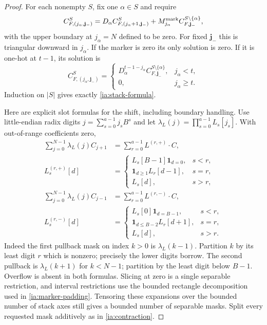 \begin{proof}
For each nonempty $S$, fix one $\alpha\in S$ and require
\begin{equation}
 C^S_{F,(j_\alpha,\mathbf j_-)}
  =D_\alpha C^S_{F,(j_\alpha+1,\mathbf j_-)}
      +M^{\rm mark}_{j_\alpha}
                 C^{S\setminus\{\alpha\}}_{F,\mathbf j_-},
                                                               \label{ia:stack-recurrence}
\end{equation}
with the upper boundary at $j_\alpha=N$ defined to be zero.
For fixed $\mathbf j_-$ this is triangular downward in $j_\alpha$.
If the marker is zero its only solution is zero.  If it is one-hot
at $t-1$, its solution is
\[
 C^S_{F,(j_\alpha,\mathbf j_-)}
   =\begin{cases}
     D_\alpha^{t-1-j_\alpha}
             C^{S\setminus\{\alpha\}}_{F,\mathbf j_-},
                       &j_\alpha<t,\\
     0,                 &j_\alpha\ge t.
    \end{cases}
\]
Induction on $|S|$ gives exactly \eqref{ia:stack-formula}.

Here are explicit slot formulas for the shift, including boundary
handling.  Use little-endian radix digits
$j=\sum_{s=0}^{a-1}j_sB^s$ and let
$\lambda_L(j)=\prod_{s=0}^{a-1}L_s[j_s]$.  With out-of-range
coefficients zero,
\begin{align}
 \sum_{j=0}^{N-1}\lambda_L(j)C_{j+1}
   &=\sum_{r=0}^{a-1}L^{(r,+)}\cdot C,
                                                        \label{ia:radix-plus}\\
 L_s^{(r,+)}[d]
   &=\begin{cases}
      L_s[B-1]\mathbf1_{d=0},&s<r,\\
      \mathbf1_{d\ge1}L_r[d-1],&s=r,\\
      L_s[d],&s>r,
     \end{cases}                                      \nonumber\\
 \sum_{j=0}^{N-1}\lambda_L(j)C_{j-1}
   &=\sum_{r=0}^{a-1}L^{(r,-)}\cdot C,
                                                        \label{ia:radix-minus}\\
 L_s^{(r,-)}[d]
   &=\begin{cases}
      L_s[0]\mathbf1_{d=B-1},&s<r,\\
      \mathbf1_{d\le B-2}L_r[d+1],&s=r,\\
      L_s[d],&s>r.
     \end{cases}                                      \nonumber
\end{align}
Indeed the first pullback mask on index $k>0$ is
$\lambda_L(k-1)$.  Partition $k$ by its least digit $r$ which is
nonzero; precisely the lower digits borrow.  The second pullback
is $\lambda_L(k+1)$ for $k<N-1$; partition by the least digit below
$B-1$.  Overflow is absent in both formulas.  Slicing at zero is
a single separable restriction, and interval restrictions use the
bounded rectangle decomposition used in \eqref{ia:marker-padding}.
Tensoring these expansions over the bounded number of stack axes
still gives a bounded number of separable masks.  Split every
requested mask additively as in \eqref{ia:contraction}.


\end{proof}
